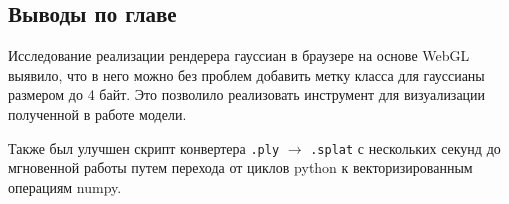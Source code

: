 \subsection{Выводы по главе}

Исследование реализации рендерера гауссиан в браузере на основе WebGL выявило, что в него можно без проблем добавить метку класса для гауссианы размером до 4 байт. Это позволило реализовать инструмент для визуализации полученной в работе модели.

Также был улучшен скрипт конвертера \texttt{.ply} $\to$ \texttt{.splat} с нескольких секунд до мгновенной работы путем перехода от циклов python к векторизированным операциям numpy.